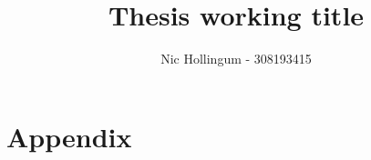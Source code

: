 \documentclass{report}
\author{Nic Hollingum - 308193415}
\title{Thesis working title}
\begin{document}
\maketitle

\tableofcontents












\chapter{Appendix}




\end{document}
